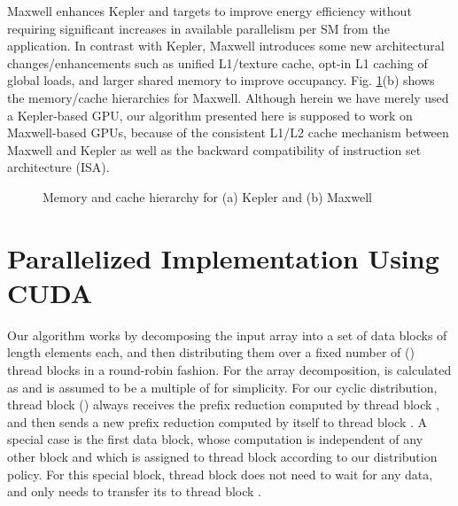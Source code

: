 \documentclass[article]{elsarticle}
\begin{document}
{Maxwell enhances Kepler and targets to improve energy efficiency without requiring significant increases in available parallelism per SM from the application. In contrast with Kepler, Maxwell introduces some new architectural changes/enhancements such as unified L1/texture cache, opt-in L1 caching of global loads, and larger shared memory to improve occupancy. Fig. \ref{fig:gpu_memory}(b) shows the memory/cache hierarchies for Maxwell. Although herein we have merely used a Kepler-based GPU, our algorithm presented here is supposed to work on Maxwell-based GPUs, because of the consistent L1/L2 cache mechanism between Maxwell and Kepler as well as the backward compatibility of instruction set architecture (ISA).
\begin{figure}[!h]
\centering
\begin{minipage}[b]{0.49\linewidth}
\end{minipage}
\begin{minipage}[b]{0.49\linewidth}
\end{minipage}

\caption{Memory and cache hierarchy for (a) Kepler and (b) Maxwell}
\label{fig:gpu_memory}
\end{figure}


\section{Parallelized Implementation Using CUDA}
Our algorithm works by decomposing the input array  into a set of  data blocks of length  elements each, and then distributing them over a fixed number of  (\mbox{}) thread blocks in a round-robin fashion. For the array decomposition,  is calculated as  and  is assumed to be a multiple of  for simplicity. For our cyclic distribution, thread block  (\mbox{}) always receives the prefix reduction  computed by thread block , and then sends a new prefix reduction  computed by itself to thread block . A special case is the first data block, whose computation is independent of any other block  and which is assigned to thread block  according to our distribution policy. For this special block, thread block  does not need to wait for any data, and only needs to transfer its  to thread block .

}
\end{document}
